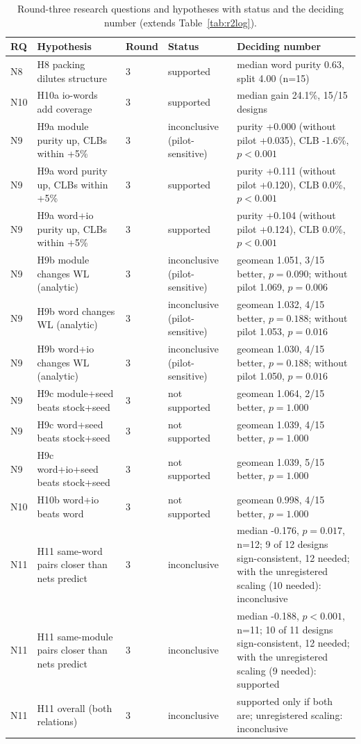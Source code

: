 \begin{table}[t]
\caption{Round-three research questions and hypotheses with status and the deciding number (extends Table~\ref{tab:r2log}).}
\label{tab:r3log}
\centering
\footnotesize\setlength{\tabcolsep}{3pt}
\begin{tabular}{@{}lp{2.5cm}lp{1.5cm}p{2.2cm}@{}}
\toprule
RQ & Hypothesis & Round & Status & Deciding number \\
\midrule
N8 & H8 packing dilutes structure & 3 & supported & median word purity 0.63, split 4.00 (n=15) \\
N10 & H10a io-words add coverage & 3 & supported & median gain 24.1\%, 15/15 designs \\
N9 & H9a module purity up, CLBs within +5\% & 3 & inconclusive (pilot-sensitive) & purity +0.000 (without pilot +0.035), CLB -1.6\%, $p<0.001$ \\
N9 & H9a word purity up, CLBs within +5\% & 3 & supported & purity +0.111 (without pilot +0.120), CLB 0.0\%, $p<0.001$ \\
N9 & H9a word+io purity up, CLBs within +5\% & 3 & supported & purity +0.104 (without pilot +0.124), CLB 0.0\%, $p<0.001$ \\
N9 & H9b module changes WL (analytic) & 3 & inconclusive (pilot-sensitive) & geomean 1.051, 3/15 better, $p=0.090$; without pilot 1.069, $p=0.006$ \\
N9 & H9b word changes WL (analytic) & 3 & inconclusive (pilot-sensitive) & geomean 1.032, 4/15 better, $p=0.188$; without pilot 1.053, $p=0.016$ \\
N9 & H9b word+io changes WL (analytic) & 3 & inconclusive (pilot-sensitive) & geomean 1.030, 4/15 better, $p=0.188$; without pilot 1.050, $p=0.016$ \\
N9 & H9c module+seed beats stock+seed & 3 & not supported & geomean 1.064, 2/15 better, $p=1.000$ \\
N9 & H9c word+seed beats stock+seed & 3 & not supported & geomean 1.039, 4/15 better, $p=1.000$ \\
N9 & H9c word+io+seed beats stock+seed & 3 & not supported & geomean 1.039, 5/15 better, $p=1.000$ \\
N10 & H10b word+io beats word & 3 & not supported & geomean 0.998, 4/15 better, $p=1.000$ \\
N11 & H11 same-word pairs closer than nets predict & 3 & inconclusive & median -0.176, $p=0.017$, n=12; 9 of 12 designs sign-consistent, 12 needed; with the unregistered scaling (10 needed): inconclusive \\
N11 & H11 same-module pairs closer than nets predict & 3 & inconclusive & median -0.188, $p<0.001$, n=11; 10 of 11 designs sign-consistent, 12 needed; with the unregistered scaling (9 needed): supported \\
N11 & H11 overall (both relations) & 3 & inconclusive & supported only if both are; unregistered scaling: inconclusive \\
\bottomrule
\end{tabular}
\end{table}
